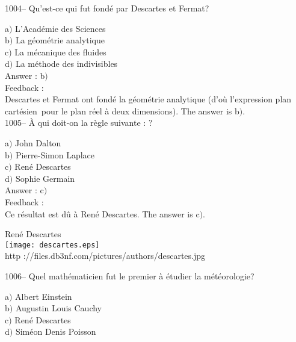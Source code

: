 ﻿\documentclass[letterpaper, 12pt]{article}
\begin{document}
1004-- Qu'est-ce qui fut fond\'e par Descartes et Fermat?

a$)$ L'Acad\'emie des Sciences \\
b$)$ La g\'eom\'etrie analytique \\
c$)$ La m\'ecanique des fluides \\
d$)$ La m\'ethode des indivisibles\\

Answer : b$)$\\

Feedback : \\
Descartes et Fermat ont fond\'e la g\'eom\'etrie analytique (d'o\`u
l'expression \og plan cart\'esien\fg\ pour le plan r\'eel \`a deux
dimensions).
The answer is b$)$.\\

1005-- \`A qui doit-on la r\`egle suivante : \fg ?

a$)$ John Dalton \\
b$)$ Pierre-Simon Laplace \\
c$)$ Ren\'e Descartes \\
d$)$ Sophie Germain\\

Answer : c$)$\\

Feedback : \\
Ce r\'esultat est d\^u \`a Ren\'e Descartes.
The answer is c$)$.\\

        \begin{center}
        Ren\'e Descartes\\
    \texttt{[image: descartes.eps]}\\
        {\footnotesize http
://files.db3nf.com/pictures/authors/descartes.jpg}
    \end{center}

1006-- Quel math\'ematicien fut le premier \`a \'etudier la
m\'et\'eorologie?

a$)$ Albert Einstein \\
b$)$ Augustin Louis Cauchy \\
c$)$ Ren\'e Descartes \\
d$)$ Sim\'eon Denis Poisson\\
\end{document}
